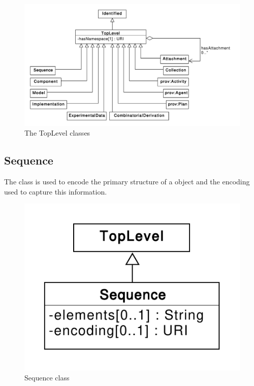 \begin{figure}[ht]
\begin{center}
\includegraphics[width=\textwidth]{uml/toplevel}
\caption[]{The TopLevel classes}
\label{uml:toplevel}
\end{center}
\end{figure}




\subsection{Sequence}
\label{sec:Sequence}
The  class is used to encode the primary structure of a  object and the encoding used to capture this information.

\begin{figure}[ht]
\begin{center}
\includegraphics[scale=0.6]{uml/sequence}
\caption[]{Sequence class}
\label{uml:sequence}
\end{center}
\end{figure}


